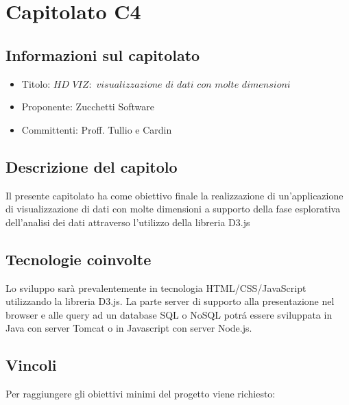 \documentclass[a4paper, oneside, dvipsnames, table]{article}
\begin{document}
\section{Capitolato C4}
\subsection{Informazioni sul capitolato}
\begin{itemize}
\item Titolo: $HD$ $VIZ:$ $visualizzazione$ $di$ $dati$ $con$ $molte$ $dimensioni$
\item Proponente: Zucchetti Software
\item Committenti: Proff. Tullio e Cardin
\end{itemize}

\subsection{Descrizione del capitolo}
Il presente capitolato ha come obiettivo finale la realizzazione di un’applicazione di visualizzazione di dati con molte dimensioni a supporto della fase esplorativa dell’analisi dei dati attraverso l'utilizzo della libreria D3.js

\subsection{Tecnologie coinvolte}
Lo sviluppo sarà prevalentemente in tecnologia HTML/CSS/JavaScript utilizzando la libreria D3.js.
La parte server di supporto alla presentazione nel browser e alle query ad un database SQL o NoSQL potr\'a essere sviluppata in Java con server Tomcat o in Javascript con server Node.js.

\subsection{Vincoli}
Per raggiungere gli obiettivi minimi del progetto viene richiesto:
\end{document}

